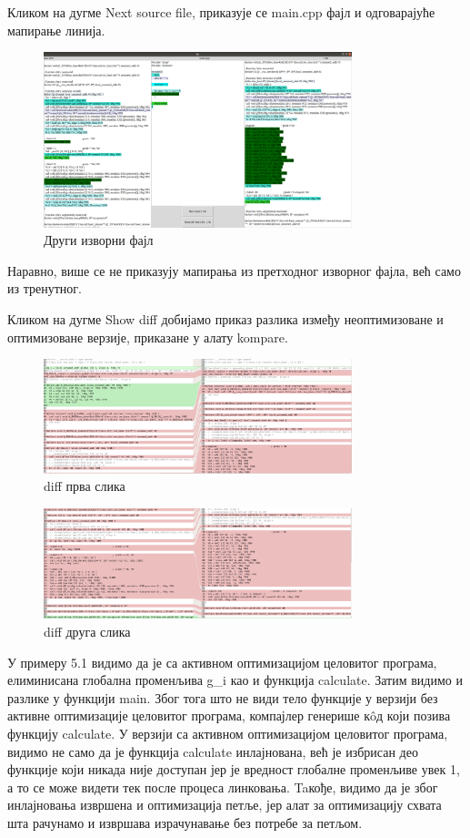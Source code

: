 \documentclass[12pt,oneside]{memoir}
\begin{document}
Кликом на дугме Next source file, приказује се main.cpp фајл и одговарајуће 
мапирање линија.
\begin{figure}[!ht]
  \centering
  \includegraphics[width=0.8\textwidth]{main_cpp.png}
  \caption{Други изворни фајл }
  \label{fig:grafikon}
\end{figure}
Наравно, више се не приказују мапирања из претходног изворног фајла, већ само из
тренутног.

Кликом на дугме Show diff добијамо приказ разлика између неоптимизоване и оптимизоване
верзије, приказане у алату kompare.
\begin{figure}[!ht]
  \centering
  \includegraphics[width=0.8\textwidth]{diff_1.png}
  \caption{diff прва слика }
  \label{fig:grafikon}
\end{figure}
\begin{figure}[!ht]
  \centering
  \includegraphics[width=0.8\textwidth]{diff_2.png}
  \caption{diff друга слика }
  \label{fig:grafikon}
\end{figure}

У примеру 5.1 видимо да је са активном оптимизацијом целовитог програма,
елиминисана глобална променљива g{\_}i  као и функција calculate.
Затим видимо и разлике у функцији main. 
Због тога што не види тело функције у верзији без активне оптимизације целовитог
програма, компајлер генерише к\^{o}д који позива функцију calculate.
У верзији са активном оптимизацијом целовитог програма, видимо не само да је функција
calculate инлајнована, већ је избрисан део функције који никада није доступан
јер је вредност глобалне променљиве увек 1, а то се може видети тек после процеса
линковања.
Taкође, видимо да је због инлајновања извршена и оптимизација петље, јер алат за
оптимизацију схвата шта рачунамо и извршава израчунавање без потребе за петљом.
\end{document}
